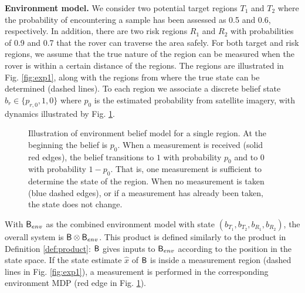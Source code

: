 \documentclass{ifacconf}
\begin{document}
\textbf{Environment model.} We consider two potential target regions $T_1$ and $T_2$ where the probability of encountering a sample has been assessed as 0.5 and 0.6, respectively. In addition, there are two risk regions $R_1$ and $R_2$ with probabilities of 0.9 and 0.7 that the rover can traverse the area safely. For both target and risk regions, we assume that the true nature of the region can be measured when the rover is within a certain distance of the regions. The regions are illustrated in Fig. \ref{fig:exp1}, along with the regions from where the true state can be determined (dashed lines). To each region we associate a discrete belief state $b_r \in \{ p_{r,0}, 1, 0 \}$ where $p_0$ is the estimated probability from satellite imagery, with dynamics illustrated by Fig. \ref{fig:envmdp}.

\begin{figure}
  \begin{center}
  \end{center}
  \caption{Illustration of environment belief model for a single region. At the beginning the belief is $p_0$. When a measurement is received (solid red edges), the belief transitions to $1$ with probability $p_0$ and to $0$ with probability $1-p_0$. That is, one measurement is sufficient to determine the state of the region. When no measurement is taken (blue dashed edges), or if a measurement has already been taken, the state does not change.}
  \label{fig:envmdp}
\end{figure}

With $\mathsf{B}_{env}$ as the combined environment model with state $(b_{T_1}, b_{T_2}, b_{R_1}, b_{R_2})$, the overall system is $\mathsf{B} \otimes \mathsf{B}_{env}$. This product is defined similarly to the product in Definition \ref{def:product}: $\mathsf{B}$ gives inputs to $\mathsf{B}_{env}$ according to the position in the state space. If the state estimate $\hat x$ of $\mathsf{B}$ is inside a measurement region (dashed lines in Fig. \ref{fig:exp1}), a measurement is performed in the corresponding environment MDP (red edge in Fig. \ref{fig:envmdp}).
\end{document}
